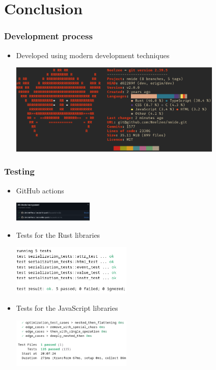 \section{Conclusion}
\SectionPage

\begin{frame}
  \frametitle{Development process}
  \begin{itemize}
    \item Developed using modern development techniques
    \pause
    \begin{center}
      \includegraphics[width=0.8\textwidth]{./pics/onefetch.png}
    \end{center}
  \end{itemize}
\end{frame}

\begin{frame}
  \frametitle{Testing}
  \begin{itemize}
    \item GitHub actions
    \begin{center}
      \includegraphics[width=0.3\textwidth]{./pics/github-actions.png}
    \end{center}
    \item Tests for the Rust libraries
    \begin{center}
      \includegraphics[width=0.45\textwidth]{./pics/librstest.png}
    \end{center}
    \item Tests for the JavaScript libraries
    \begin{center}
      \includegraphics[width=0.45\textwidth]{./pics/libtest.png}
    \end{center}
  \end{itemize}
\end{frame}

